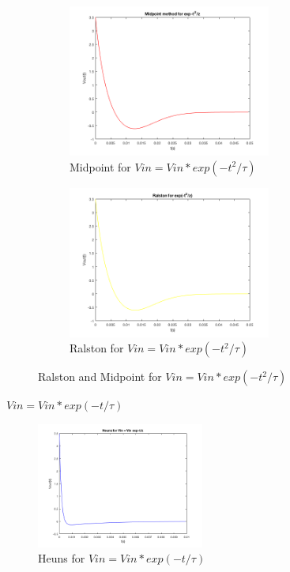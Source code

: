 \documentclass[11pt,a4paper]{article}
\begin{document}
\begin{figure}[h]
\begin{subfigure}{.5\textwidth}
  \includegraphics[width=.9\linewidth,height = 5cm]{Ex1_Figs/mid_t2.png}
  \caption[right]{Midpoint for $Vin = Vin*exp(-t^2/\tau)$}
  \label{fig:RL7}
\end{subfigure}
\begin{subfigure}{.5\textwidth}
  \includegraphics[width=.9\linewidth,height = 5cm]{Ex1_Figs/ral_t2.png}
  \caption{Ralston for $Vin = Vin*exp(-t^2/\tau)$}
  \label{fig:RL8}
\end{subfigure}
\caption{Ralston and Midpoint for $Vin = Vin*exp(-t^2/\tau)$}
\label{fig:RLx}
\end{figure}



\newpage
$Vin = Vin*exp(-t/\tau)$

\begin{figure}
\vspace{-15mm}
\includegraphics[width=0.49\textwidth,center]{Ex1_Figs/heuns_t.png}
\vspace{-6mm}
\caption{Heuns for $Vin = Vin*exp(-t/\tau)$}
\label{fig:RL9}
\end{figure}
\end{document}
